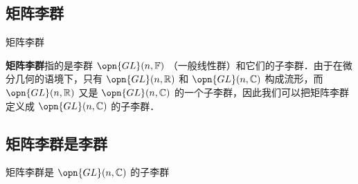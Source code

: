
\begin{issues}
\issueDraft
\end{issues}


\subsection{矩阵李群}

\begin{definition}{矩阵李群}

\textbf{矩阵李群}指的是李群 $\opn{GL}(n, \mathbb{F})$ （一般线性群）和它们的子李群．由于在微分几何的语境下，只有 $\opn{GL}(n, \mathbb{R})$ 和 $\opn{GL}(n, \mathbb{C})$ 构成流形，而 $\opn{GL}(n, \mathbb{R})$ 又是 $\opn{GL}(n, \mathbb{C})$ 的一个子李群，因此我们可以把矩阵李群定义成 $\opn{GL}(n, \mathbb{C})$ 的子李群．

\end{definition}


\subsection{矩阵李群是李群}

\begin{theorem}{}

矩阵李群是 $\opn{GL}(n, \mathbb{C})$ 的子李群

\end{theorem}